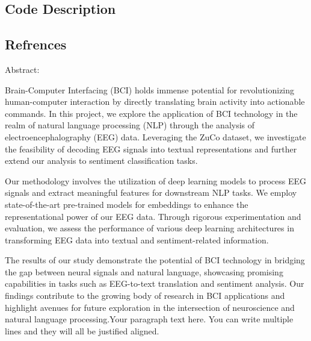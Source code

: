 \documentclass[11pt]{article}
\begin{document}
\subsection{Code Description}
\label{sec:orga8ff932}
\subsection{Refrences}
\label{sec:org9a689b4}

Abstract:
\begin{justify}
Brain-Computer Interfacing (BCI) holds immense potential for revolutionizing human-computer interaction by directly translating brain activity into actionable commands. In this project, we explore the application of BCI technology in the realm of natural language processing (NLP) through the analysis of electroencephalography (EEG) data. Leveraging the ZuCo dataset, we investigate the feasibility of decoding EEG signals into textual representations and further extend our analysis to sentiment classification tasks.

Our methodology involves the utilization of deep learning models to process EEG signals and extract meaningful features for downstream NLP tasks. We employ state-of-the-art pre-trained models for embeddings to enhance the representational power of our EEG data. Through rigorous experimentation and evaluation, we assess the performance of various deep learning architectures in transforming EEG data into textual and sentiment-related information.

The results of our study demonstrate the potential of BCI technology in bridging the gap between neural signals and natural language, showcasing promising capabilities in tasks such as EEG-to-text translation and sentiment analysis. Our findings contribute to the growing body of research in BCI applications and highlight avenues for future exploration in the intersection of neuroscience and natural language processing.Your paragraph text here. You can write multiple lines and they will all be justified aligned.
\end{justify}
\end{document}
